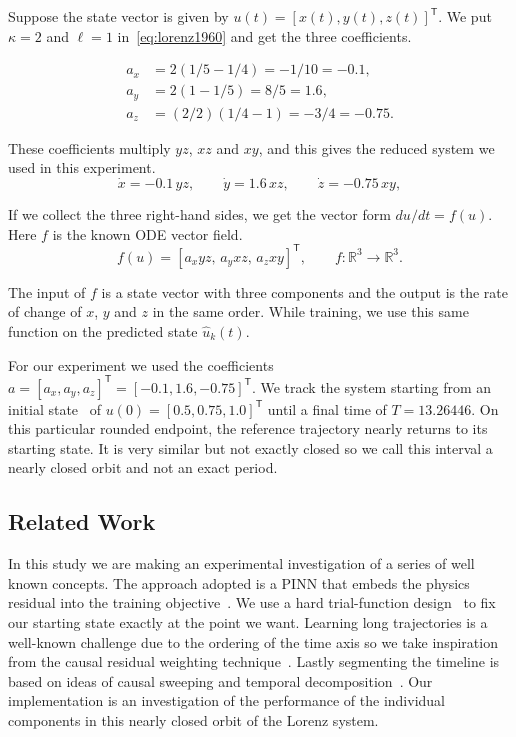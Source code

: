 \documentclass[conference]{IEEEtran}
\begin{document}
Suppose the state vector is given by $u(t)=[x(t),y(t),z(t)]^\mathsf{T}$. We put $\kappa=2$ and $\ell=1$ in~\eqref{eq:lorenz1960} and get the three coefficients.


\[
\begin{aligned}
a_x&=2(1/5-1/4)=-1/10=-0.1,\\
a_y&=2(1-1/5)=8/5=1.6,\\
a_z&=(2/2)(1/4-1)=-3/4=-0.75.
\end{aligned}
\]

These coefficients multiply $yz$, $xz$ and $xy$, and this gives the reduced system we used in this experiment.
\begin{equation}
\dot{x}=-0.1\,yz,\qquad \dot{y}=1.6\,xz,\qquad \dot{z}=-0.75\,xy,
\label{eq:ode}
\end{equation}

If we collect the three right-hand sides, we get the vector form $du/dt=f(u)$. Here $f$ is the known ODE vector field.
\[
f(u)=[a_x yz,\,a_y xz,\,a_z xy]^\mathsf{T},\qquad f:\mathbb{R}^{3}\to\mathbb{R}^{3}.
\]

The input of $f$ is a state vector with three components and the output is the rate of change of $x$, $y$ and $z$ in the same order. While training, we use this same function on the predicted state $\hat{u}_k(t)$.

For our experiment we used the coefficients $a=[a_x,a_y,a_z]^\mathsf{T}=[-0.1,1.6,-0.75]^\mathsf{T}$. We track the system starting from an initial state~\cite{matthews2024pinnde} of $u(0)=[0.5,0.75,1.0]^\mathsf{T}$ until a final time of $T=13.26446$. On this particular rounded endpoint, the reference trajectory nearly returns to its starting state. It is very similar but not exactly closed so we call this interval a nearly closed orbit and not an exact period.


\subsection{Related Work}
In this study we are making an experimental investigation of a series of well known concepts. The approach adopted is a PINN that embeds the physics residual into the training objective~\cite{raissi2019}. We use a hard trial-function design~\cite{lagaris1998} to fix our starting state exactly at the point we want. Learning long trajectories is a well-known challenge due to the ordering of the time axis so we take inspiration from the causal residual weighting technique~\cite{wang2024causal}. Lastly segmenting the timeline is based on ideas of causal sweeping and temporal decomposition~\cite{penwarden2023}. Our implementation is an investigation of the performance of the individual components in this nearly closed orbit of the Lorenz system.
\end{document}
